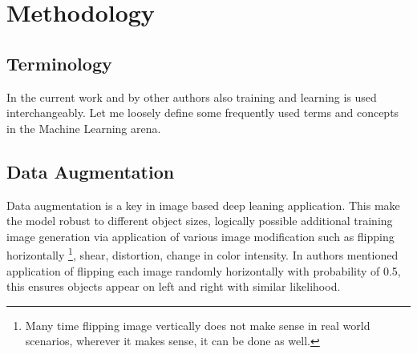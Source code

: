 
\chapter{Methodology}

\section{Terminology}
In the current work and by other authors also training and learning is used interchangeably. Let me loosely define some frequently used terms and concepts in the Machine Learning arena.

\section{Data Augmentation}
Data augmentation  is a key in image based deep leaning application. This make the model robust to different object sizes, logically possible  additional training image generation via application of various image modification such as flipping horizontally \footnote{Many time flipping image vertically does not make sense in real world scenarios, wherever it makes sense, it can be done as well.}, shear, distortion, change in color intensity. In \cite{liu2016ssd} authors mentioned application of flipping each image randomly horizontally with probability of 0.5, this ensures objects appear on left and right with similar likelihood.

